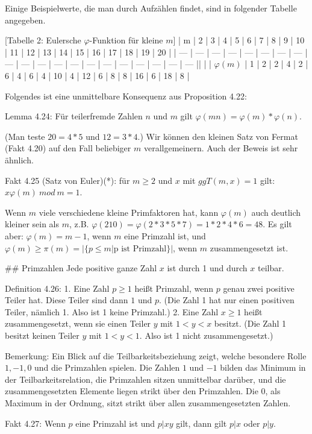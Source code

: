 \documentclass[a4paper]{article}
\begin{document}
\begin{multicols}{3}
Einige Beispielwerte, die man durch Aufzählen findet, sind in folgender Tabelle angegeben.

[Tabelle 2: Eulersche $\varphi$-Funktion für kleine $m$]
| m   | 2   | 3   | 4   | 5   | 6   | 7   | 8   | 9   | 10  | 11  | 12  | 13  | 14  | 15  | 16  | 17  | 18  | 19  | 20  |
| --- | --- | --- | --- | --- | --- | --- | --- | --- | --- | --- | --- | --- | --- | --- | --- | --- | --- | --- | --- ||  |
| $\varphi(m)$ | 1   | 2   | 2   | 4   | 2   | 6   | 4   | 6   | 4   | 10  | 4   | 12  | 6   | 8   | 8   | 16  | 6   | 18  | 8   |

Folgendes ist eine unmittelbare Konsequenz aus Proposition 4.22:

Lemma 4.24: Für teilerfremde Zahlen $n$ und $m$ gilt $\varphi(mn)=\varphi(m)*\varphi(n)$.

(Man teste $20=4*5$ und $12=3*4$.)
Wir können den kleinen Satz von Fermat (Fakt 4.20) auf den Fall beliebiger $m$ verallgemeinern. Auch der Beweis ist sehr ähnlich.

Fakt 4.25 (Satz von Euler)(*): für $m\geq 2$ und $x$ mit $ggT(m,x) = 1$ gilt: $x\varphi(m)\ mod\ m=1$.

Wenn $m$ viele verschiedene kleine Primfaktoren hat, kann $\varphi(m)$ auch deutlich kleiner sein als $m$, z.B. $\varphi(210) =\varphi(2*3*5*7)=1*2*4*6=48$. Es gilt aber: $\varphi(m) =m-1$, wenn $m$ eine Primzahl ist, und $\varphi(m)\geq \pi(m) =|\{p\leq m|\text{p ist Primzahl}\}|$, wenn $m$ zusammengesetzt ist.

## Primzahlen
Jede positive ganze Zahl $x$ ist durch 1 und durch $x$ teilbar.

Definition 4.26:
1. Eine Zahl $p\geq 1$ heißt Primzahl, wenn $p$ genau zwei positive Teiler hat. Diese Teiler sind dann $1$ und $p$. (Die Zahl 1 hat nur einen positiven Teiler, nämlich 1. Also ist 1 keine Primzahl.)
2. Eine Zahl $x\geq 1$ heißt zusammengesetzt, wenn sie einen Teiler $y$ mit $1<y < x$ besitzt. (Die Zahl 1 besitzt keinen Teiler $y$ mit $1<y<1$. Also ist 1 nicht zusammengesetzt.)

Bemerkung: Ein Blick auf die Teilbarkeitsbeziehung zeigt, welche besondere Rolle $1,-1, 0$ und die Primzahlen spielen. Die Zahlen $1$ und $-1$ bilden das Minimum in der Teilbarkeitsrelation, die Primzahlen sitzen unmittelbar darüber, und die zusammengesetzten Elemente liegen strikt über den Primzahlen. Die $0$, als Maximum in der Ordnung, sitzt strikt über allen zusammengesetzten Zahlen.

Fakt 4.27: Wenn $p$ eine Primzahl ist und $p|xy$ gilt, dann gilt $p|x$ oder $p|y$.


\end{multicols}
\end{document}
